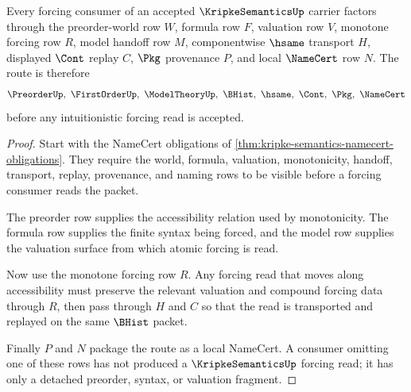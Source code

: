 \begin{theorem}
\label{thm:kripke-semantics-monotone-forcing-route}
Every forcing consumer of an accepted $\KripkeSemanticsUp$ carrier factors through the preorder-world row $W$, formula row $F$, valuation row $V$, monotone forcing row $R$, model handoff row $M$, componentwise $\hsame$ transport $H$, displayed $\Cont$ replay $C$, $\Pkg$ provenance $P$, and local $\NameCert$ row $N$. The route is therefore
$$
\PreorderUp,\ \FirstOrderUp,\ \ModelTheoryUp,\ \BHist,\ \hsame,\ \Cont,\ \Pkg,\ \NameCert
$$
before any intuitionistic forcing read is accepted.
\end{theorem}
\begin{proof}
Start with the NameCert obligations of \autoref{thm:kripke-semantics-namecert-obligations}. They require the world, formula, valuation, monotonicity, handoff, transport, replay, provenance, and naming rows to be visible before a forcing consumer reads the packet.

The preorder row supplies the accessibility relation used by monotonicity. The formula row supplies the finite syntax being forced, and the model row supplies the valuation surface from which atomic forcing is read.

Now use the monotone forcing row $R$. Any forcing read that moves along accessibility must preserve the relevant valuation and compound forcing data through $R$, then pass through $H$ and $C$ so that the read is transported and replayed on the same $\BHist$ packet.

Finally $P$ and $N$ package the route as a local NameCert. A consumer omitting one of these rows has not produced a $\KripkeSemanticsUp$ forcing read; it has only a detached preorder, syntax, or valuation fragment.
\end{proof}



\begin{closurestatus}{\KripkeSemanticsUp}
  \theoryclosure{\seedClosure}
  \formalstatus{\formalTargetV}
\end{closurestatus}
